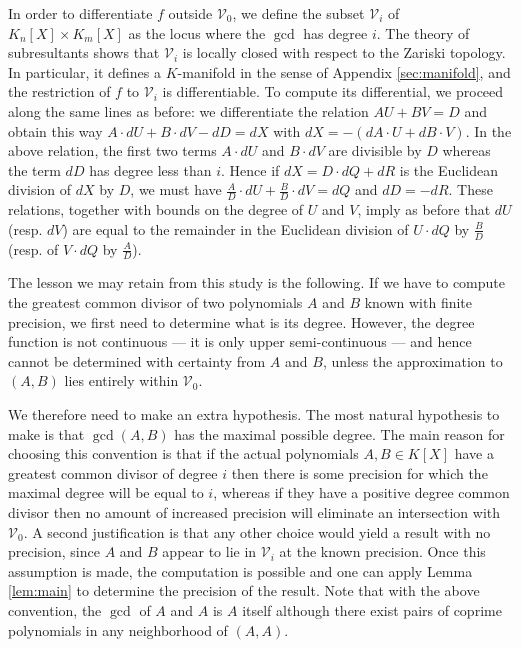 \documentclass{lms}
\begin{document}
In order to differentiate $f$ outside $\mathcal V_0$, we 
define the subset $\mathcal V_i$ of $K_n[X] \times 
K_m[X]$ as the locus where the $\gcd$ has degree $i$. The theory of 
subresultants shows that $\mathcal V_i$ is locally closed with respect to 
the Zariski topology. In particular, it defines a $K$-manifold in the 
sense of Appendix \ref{sec:manifold}, and the 
restriction of $f$ to $\mathcal V_i$ is differentiable. To compute
its differential, we proceed along the same lines as before: we 
differentiate the relation $AU + BV = D$ and obtain this way
$A \cdot dU + B \cdot dV - dD = dX$
with $dX = - (dA \cdot U + dB \cdot V)$. In the above relation, the
first two terms $A{\cdot}dU$ and $B{\cdot}dV$ are divisible by $D$ 
whereas the term $dD$ has degree less than $i$. 
Hence if $dX = D \cdot dQ + dR$ is the Euclidean division of $dX$ by $D$, 
we must have $\frac A D \cdot dU + \frac B D \cdot dV = dQ$ and $dD = 
-dR$. These relations, together with bounds on the degree of $U$ and $V$,
imply as before that $dU$ (resp. $dV$) are equal to the remainder in the
Euclidean division of $U{\cdot}dQ$ by $\frac B D$ (resp. of $V{\cdot}dQ$
by $\frac A D$).

\medskip

The lesson we may retain from this study is the following. If we have to 
compute the greatest common divisor of two polynomials $A$ and $B$ known 
with finite precision, we first need to determine what is its degree. 
However, the degree function is not continuous --- it is only upper 
semi-continuous --- and hence cannot be determined with certainty from $A$ and 
$B$, unless the approximation to $(A,B)$ lies entirely within $\mathcal V_0$.

We therefore need to make an extra hypothesis.  The most natural hypothesis to make
is that $\gcd(A, B)$ has the maximal possible degree.  The main reason for choosing
this convention is that if the actual polynomials $A, B \in K[X]$ have a greatest common
divisor of degree $i$ then there is some precision for which the maximal degree will be
equal to $i$, whereas if they have a positive
degree common divisor then no amount of increased precision will eliminate an intersection
with $\mathcal V_0$.  A second justification is that any other choice would yield a result
with no precision, since $A$ and $B$ appear to lie in $\mathcal V_i$ at the known precision.
Once this assumption is made, the computation is possible and one can apply Lemma 
\ref{lem:main} to determine the precision of the result.
Note that with the above convention, the $\gcd$ of $A$ and $A$ is $A$ 
itself although there exist pairs of coprime polynomials in any 
neighborhood of $(A,A)$.
\end{document}
